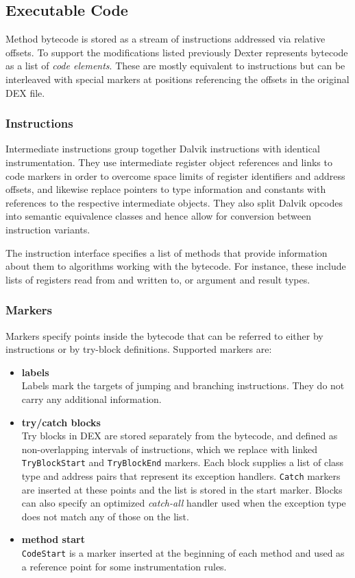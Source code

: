\documentclass[12pt,twoside,notitlepage]{report}
\begin{document}
\subsection{Executable Code}

Method bytecode is stored as a stream of instructions addressed via relative offsets. To support the modifications listed previously Dexter represents bytecode as a list of \emph{code elements}. These are mostly equivalent to instructions but can be interleaved with special markers at positions referencing the offsets in the original DEX file.

\subsubsection{Instructions}

Intermediate instructions group together Dalvik instructions with identical instrumentation. They use intermediate register object references and links to code markers in order to overcome space limits of register identifiers and address offsets, and likewise replace pointers to type information and constants with references to the respective intermediate objects. They also split Dalvik opcodes into semantic equivalence classes and hence allow for conversion between instruction variants.

The instruction interface specifies a list of methods that provide information about them to algorithms working with the bytecode. For instance, these include lists of registers read from and written to, or argument and result types.

\subsubsection{Markers}

Markers specify points inside the bytecode that can be referred to either by instructions or by try-block definitions. Supported markers are:
\begin{itemize}
\item \textbf{labels} \\
Labels mark the targets of jumping and branching instructions. They do not carry any additional information.
\item \textbf{try/catch blocks} \\
Try blocks in DEX are stored separately from the bytecode, and defined as non-overlapping intervals of instructions, which we replace with linked \verb$TryBlockStart$ and \verb$TryBlockEnd$ markers. Each block supplies a list of class type and address pairs that represent its exception handlers. \verb$Catch$ markers are inserted at these points and the list is stored in the start marker. Blocks can also specify an optimized \emph{catch-all} handler used when the exception type does not match any of those on the list.
\item \textbf{method start} \\
\verb$CodeStart$ is a marker inserted at the beginning of each method and used as a reference point for some instrumentation rules.
\end{itemize}
\end{document}
